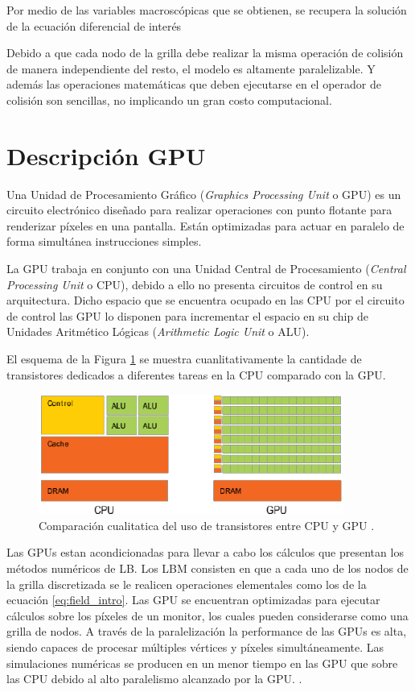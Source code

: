 Por medio de las variables macroscópicas que se obtienen, se recupera la solución de la ecuación diferencial de interés

Debido a que cada nodo de la grilla debe realizar la misma operación de colisión de manera independiente del resto, el modelo es altamente paralelizable. Y además las operaciones matemáticas que deben ejecutarse en el operador de colisión son sencillas, no implicando un gran costo computacional.


\section{Descripción GPU}

Una Unidad de Procesamiento Gráfico (\textit{Graphics Processing Unit} o GPU) es un  circuito electrónico diseñado para realizar operaciones con punto flotante para renderizar píxeles en una pantalla. Están optimizadas para actuar en paralelo de forma simultánea instrucciones simples.

La GPU trabaja en conjunto con una Unidad Central de Procesamiento (\textit{Central Processing Unit} o CPU), debido a ello no presenta circuitos de control en su arquitectura. Dicho espacio que se encuentra ocupado en las CPU por el circuito de control las GPU lo disponen para incrementar el espacio en su chip de Unidades Aritmético Lógicas (\textit{Arithmetic Logic Unit} o ALU).

El esquema de la Figura \ref{fig:cpu_gpu_transis} se muestra cuanlitativamente la cantidade de transistores dedicados a diferentes tareas en la CPU comparado con la GPU.

\begin{figure}[h!]
	\centering
	\includegraphics[width=10cm]{cpu_gpu.png}
	\caption{Comparación cualitatica del uso de transistores entre CPU y GPU \cite{rinaldi2011modelos}.}
	\label{fig:cpu_gpu_transis}
\end{figure}

Las GPUs estan acondicionadas para llevar a cabo los cálculos que presentan los métodos numéricos de LB. Los LBM consisten en que a cada uno de los nodos de la grilla discretizada se le realicen operaciones elementales como los de la ecuación \ref{eq:field_intro}. Las GPU se encuentran optimizadas para ejecutar cálculos sobre los píxeles de un monitor, los cuales pueden considerarse como una grilla de nodos. A través de la paralelización la performance de las GPUs es alta, siendo capaces de procesar múltiples vértices y píxeles simultáneamente. Las simulaciones numéricas se producen en un menor tiempo en las GPU que sobre las CPU debido al alto paralelismo alcanzado por la GPU. \cite{rinaldi2011modelos}.


